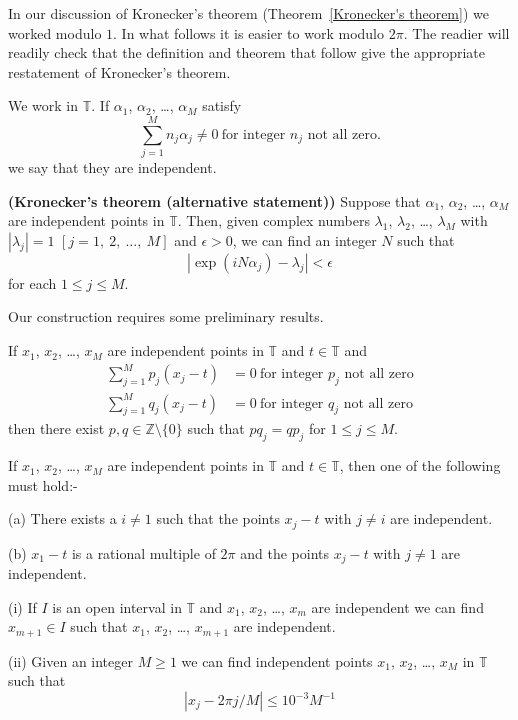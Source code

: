 In our discussion of Kronecker's theorem
(Theorem~\ref{Kronecker's theorem}) we worked
modulo $1$. In what follows it is easier
to work modulo $2\pi$. The readier will readily
check that the definition and theorem that follow
give the appropriate restatement of Kronecker's theorem.
\begin{definition}
We work in ${\mathbb T}$.
If $\alpha_{1}$, $\alpha_{2}$, \dots, $\alpha_{M}$
satisfy
\begin{equation*}
\sum_{j=1}^{M} n_{j}\alpha_{j}\neq 0
\ \text{for integer $n_{j}$ not all zero}. \tag*{$\bigstar$}
\end{equation*}
we say that they are independent.

\end{definition}
\begin{theorem}{\bf (Kronecker's theorem (alternative statement))}%
\label{alternative Kronecker} Suppose
that $\alpha_{1}$, $\alpha_{2}$, \dots, $\alpha_{M}$
are independent points in ${\mathbb T}$. Then, given complex
numbers $\lambda_{1}$, $\lambda_{2}$, \dots, $\lambda_{M}$
with $|\lambda_{j}|=1$ $[j=1,\ 2,\ \dots,\ M]$
and $\epsilon>0$, we can find an integer $N$
such that
\[|\exp(iN\alpha_{j})-\lambda_{j}|<\epsilon\]
for each $1\leq j\leq M$.
\end{theorem}

Our construction requires some preliminary results.
\begin{lemma} If  $x_{1}$, $x_{2}$, \dots, $x_{M}$
are independent points in ${\mathbb T}$ and $t\in{\mathbb T}$
and
\begin{align*}
\sum_{j=1}^{M} p_{j}(x_{j}-t)&=0
\ \text{for integer $p_{j}$ not all zero}\\
\sum_{j=1}^{M} q_{j}(x_{j}-t)&= 0
\ \text{for integer $q_{j}$ not all zero}
\end{align*}
then there exist
$p,q\in{\mathbb Z}\setminus\{0\}$
such that
$pq_{j}=qp_{j}$ for $1\leq j\leq M$.
\end{lemma}
\begin{lemma} If  $x_{1}$, $x_{2}$, \dots, $x_{M}$
are independent points in ${\mathbb T}$ and $t\in{\mathbb T}$,
then one of the following must hold:-

(a) There exists a $i\neq 1$ such that
the points $x_{j}-t$ with $j\neq i$ are independent.

(b) $x_{1}-t$ is a rational multiple of $2\pi$
and the points $x_{j}-t$ with $j\neq 1$ are independent.
\end{lemma}
\begin{lemma}\label{Kronecker set up}
(i) If $I$ is an open interval in ${\mathbb T}$
and $x_{1}$, $x_{2}$, \dots, $x_{m}$ are independent
we can find $x_{m+1}\in I$ such that
$x_{1}$, $x_{2}$, \dots, $x_{m+1}$ are independent.

(ii) Given an integer $M\geq 1$ we can find
independent points
$x_{1}$, $x_{2}$, \dots, $x_{M}$ in ${\mathbb T}$
such that
\[|x_{j}-2\pi j/M|\leq 10^{-3}M^{-1}\]
\end{lemma}

